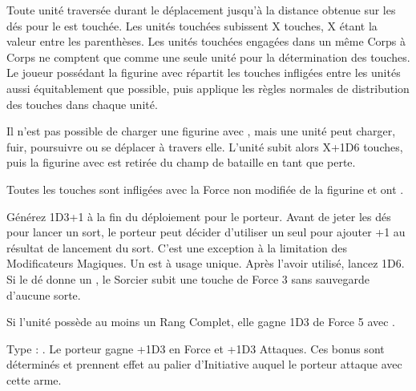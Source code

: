 Toute unité traversée durant le déplacement jusqu'à la distance obtenue sur les dés pour le \randommovement{} est touchée. Les unités touchées subissent X touches, X étant la valeur entre les parenthèses. Les unités touchées engagées dans un même Corps à Corps ne comptent que comme une seule unité pour la détermination des touches. Le joueur possédant la figurine avec \ricochet{} répartit les touches infligées entre les unités aussi équitablement que possible, puis applique les règles normales de distribution des touches dans chaque unité.

Il n'est pas possible de charger une figurine avec \ricochet{}, mais une unité peut charger, fuir, poursuivre ou se déplacer à travers elle. L'unité subit alors X+1D6 touches, puis la figurine avec \ricochet{} est retirée du champ de bataille en tant que perte.

Toutes les touches sont infligées avec la Force non modifiée de la figurine et ont .


\closearmyspecialrules


\vspace{1.5cm}
\startarmyarmoury

\startitemlistonecol

\listitemonecol{\powershrooms} Générez 1D3+1 \powershrooms{} à la fin du déploiement pour le porteur. Avant de jeter les dés pour lancer un sort, le porteur peut décider d'utiliser un seul \powershroom{} pour ajouter +1 au résultat de lancement du sort. C'est une exception à la limitation des Modificateurs Magiques. Un \powershroom{} est à usage unique. Après l'avoir utilisé, lancez 1D6. Si le dé donne un , le Sorcier subit une touche de Force 3 sans sauvegarde d'aucune sorte.

\listitemonecol{\mammothstabber} Si l'unité possède au moins un Rang Complet, elle gagne 1D3 \impacthits{} de Force 5 avec \multiplewounds{\ordnance}{\largetarget}.

\enditemlistonecol

\closearmyarmoury




\startarmymagicalitems

\armymagicalweapons

\startpricelist

Type : \hw{}. Le porteur gagne +1D3 en Force et +1D3 Attaques. Ces bonus sont déterminés et prennent effet au palier d'Initiative auquel le porteur attaque avec cette arme.

